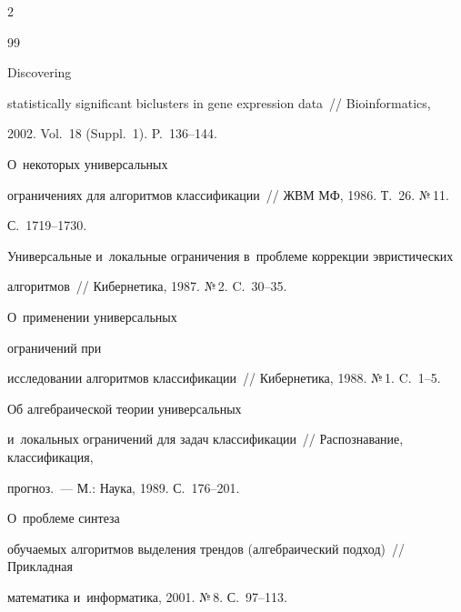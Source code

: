 \begin{multicols}{2}
{{\begin{thebibliography}{99}


 Discovering 


statistically significant biclusters in gene expression data~// Bioinformatics, 


2002. Vol.~18 (Suppl.~1). P.~136--144.













 О~некоторых универсальных 


ограничениях для алгоритмов классификации~// ЖВМ МФ, 1986. Т.~26. №\,11. 


С.~1719--1730.









Универсальные и~локальные ограничения в~проблеме коррекции эвристических 


алгоритмов~// Кибернетика, 1987. №\,2. C.~30--35.







 О~применении универсальных 


ограничений при


исследовании алгоритмов классификации~// Кибернетика, 1988. №\,1. C.~1--5.







 Об алгебраической теории универсальных 


и~локальных ограничений для задач классификации~// Распознавание, классификация, 


прогноз.~--- М.: Наука, 1989. С.~176--201.







 О~проблеме синтеза 


обуча\-емых алгоритмов выделения трендов (алгебраический подход)~// Прикладная 


математика и~информатика, 2001. №\,8. С.~97--113.





 \end{thebibliography}





 }


 }





\end{multicols}





